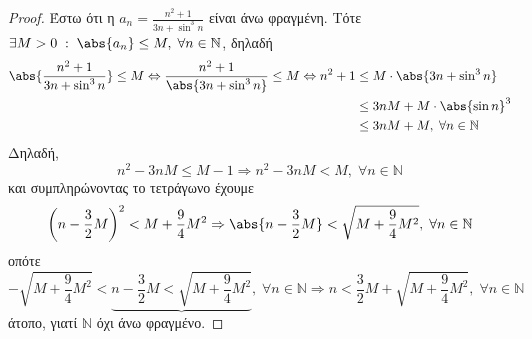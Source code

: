 \documentclass[main.tex]{subfiles}
\begin{document}
\begin{examples}
\begin{enumerate}[i)]
                \begin{proof}
                \item {}
                    Έστω ότι η $ a_{n} = \frac{n^{2}+1}{3n+ \sin^{3}{n}} $ είναι άνω 
                    φραγμένη. Τότε
                    $ \exists M>0 \; : \; \abs{a_{n}} \leq M, \; \forall n \in 
                    \mathbb{N} $, δηλαδή
                    \begin{align*}
                        \abs{\frac{n^{2}+1}{3n + \sin^{3}{n}}} \leq M \Leftrightarrow 
                        \frac{n^{2}+1}{\abs{3n + \sin^{3}{n}}} \leq M \Leftrightarrow 
                        n^{2}+1
               &\leq M \cdot \abs{3n + \sin^{3}{n}} \\ 
               &\leq 3nM + M \cdot \abs{\sin{n}} ^{3} \\
               &\leq 3n M +M, \; \forall n \in \mathbb{N}
                    \end{align*} 
                    Δηλαδή, 
                    \[
                        n^{2}-3nM \leq M-1 \Rightarrow n^{2}-3nM < M, \; \forall n \in 
                        \mathbb{N}
                    \] 
                    και συμπληρώνοντας το τετράγωνο έχουμε
                    \[
                        \left(n - \frac{3}{2} M\right)^{2} < M + \frac{9}{4} M^{2}
                        \Rightarrow \abs{n - \frac{3}{2} M} < 
                        \sqrt{M + \frac{9}{4} M^{2}}, \; \forall n \in \mathbb{N}
                    \]
                    οπότε
                    \[
                        - \sqrt{M + \frac{9}{4} M^{2}}< \underbrace{n- \frac{3}{2} M 
                        < \sqrt{M + \frac{9}{4} M^{2}}}, \; \forall n \in \mathbb{N} 
                        \Rightarrow n < \frac{3}{2} M + \sqrt{M + \frac{9}{4} M^{2}}, 
                        \; \forall n \in \mathbb{N} 
                    \] 
                    άτοπο, γιατί $ \mathbb{N} $ όχι άνω φραγμένο.
                \end{proof}
    \end{enumerate}
\end{examples}

\end{document}

